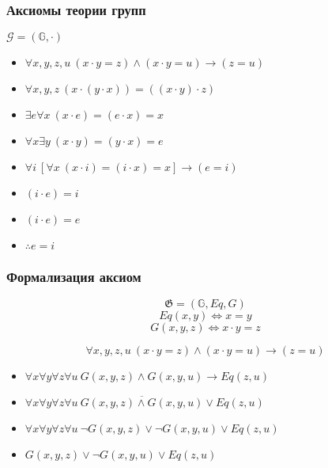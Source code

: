 \documentclass[24pt,pdf,hyperref={unicode}]{beamer}
\begin{document}
\begin{frame}\frametitle{Аксиомы теории групп}
$\mathcal{G}=(\mathbb{G},\cdot)$

\begin{itemize}
\item<+-> $\forall x,y,z,u\ (x\cdot y=z) \wedge (x\cdot y=u)\rightarrow (z=u)$

\item<+-> $\forall x,y,z\ (x\cdot (y\cdot x))=((x\cdot y)\cdot z) $

\item<+-> $\exists e\forall x\ (x\cdot e)=(e\cdot x)=x$

\item<+-> $\forall x\exists y\ (x\cdot y)=(y \cdot x)=e$
\end{itemize}

\begin{itemize}
\item<+-> $\forall i\ \left[\forall x\ (x\cdot i)=(i\cdot x)=x\right]\rightarrow (e=i)$
\end{itemize}

\begin{itemize}
\item<+-> $(i\cdot e)=i$
\item<+-> $(i\cdot e)=e$
\item<+-> $\therefore e=i$
\end{itemize}
\end{frame}


\begin{frame}\frametitle{Формализация аксиом}
$$
\mathfrak{G}=(\mathbb{G},Eq,G)
$$
$$Eq(x,y)\Leftrightarrow x=y$$
$$G(x,y,z)\Leftrightarrow x\cdot y=z$$

$$
\forall x,y,z,u\ (x\cdot y=z) \wedge (x\cdot y=u)\rightarrow (z=u)
$$
\begin{itemize}
\item<+-> $\forall x \forall y \forall z \forall u\ G(x,y,z) \wedge G(x,y,u)\rightarrow Eq(z,u)$
\item<+-> $\forall x \forall y \forall z \forall u\ \overline{G(x,y,z) \wedge G(x,y,u)}\vee Eq(z,u)$
\item<+-> $\forall x \forall y \forall z \forall u\ \neg G(x,y,z) \vee \neg G(x,y,u)\vee Eq(z,u)$
\item<+-> $G(x,y,z) \vee \neg G(x,y,u)\vee Eq(z,u)$
\end{itemize}
\end{frame}
\end{document}
